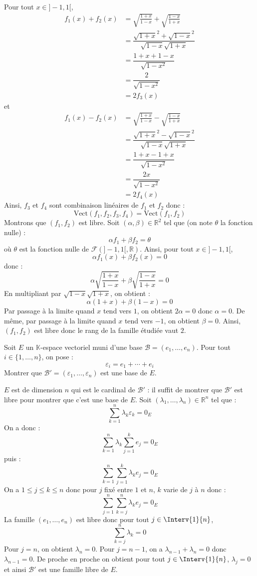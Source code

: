 \documentclass[a4paper,10pt]{report}
\begin{document}
\corr Pour tout $x \in ]-1,1[$,
\begin{align*}
 f_1(x)+f_2(x) & = \sqrt {\frac{1 + x}{1 - x}} + \sqrt {\frac{1 - x}{1 + x}}  \\
 & = \dfrac{\sqrt{1+x}^2 + \sqrt{1-x}^2}{\sqrt{1-x}\sqrt{1+x}} \\
 & = \dfrac{1+x+1-x}{\sqrt{1-x^2}}\\
 & = \dfrac{2}{\sqrt{1-x^2}}\\
 & = 2 f_3(x)
 \end{align*}
et 
\begin{align*}
 f_1(x)-f_2(x) & = \sqrt {\frac{1 + x}{1 - x}} - \sqrt {\frac{1 - x}{1 + x}}  \\
 & = \dfrac{\sqrt{1+x}^2 - \sqrt{1-x}^2}{\sqrt{1-x}\sqrt{1+x}} \\
 & = \dfrac{1+x-1+x}{\sqrt{1-x^2}}\\
 & = \dfrac{2x}{\sqrt{1-x^2}}\\
 & = 2 f_4(x)
 \end{align*}
 Ainsi, $f_3$ et $f_4$ sont combinaison linéaires de $f_1$ et $f_2$ donc :
 $$ \textrm{Vect}(f_1,f_2,f_3,f_4) = \textrm{Vect}(f_1,f_2)$$
Montrons que $(f_1,f_2)$ est libre. Soit $(\alpha, \beta) \in \mathbb{R}^2$ tel que (on note $\theta$ la fonction nulle) :
$$ \alpha f_1 + \beta f_2 = \theta$$
où $\theta$ est la fonction nulle de $\mathcal{F}(]-1,1[, \mathbb{R})$. Ainsi, pour tout $x \in ]-1,1[$,
$$ \alpha f_1(x)+ \beta f_2(x) = 0$$
donc :
$$ \alpha \sqrt {\frac{1 + x}{1 - x}} +  \beta \sqrt {\frac{1 - x}{1 + x}} = 0$$
En multipliant par $\sqrt{1-x} \sqrt{1+x}$, on obtient :
$$ \alpha (1+x) + \beta (1-x) = 0$$
Par passage à la limite quand $x$ tend vers $1$, on obtient $2\alpha=0$ donc $\alpha=0$. De même, par passage à la limite quand $x$ tend vers $-1$, on obtient $\beta=0$. Ainsi, $(f_1,f_2)$ est libre donc le rang de la famille étudiée vaut $2$.

\medskip

\begin{Exercice}{} Soit $E$ un $\mathbb{K}$-espace vectoriel muni d'une base $\mathcal{B} = (e_1 , \ldots ,e_n)$. Pour tout $i \in \lbrace 1, \ldots ,n \rbrace$, on pose :
$$\varepsilon_i = e_1 + \cdots + e_i$$
Montrer que $\mathcal{B}' = (\varepsilon_1 , \ldots ,\varepsilon_n)$ est une base de $E$.
\end{Exercice} 

\corr $E$ est de dimension $n$ qui est le cardinal de $\mathcal{B}'$ : il suffit de montrer que $\mathcal{B}'$ est libre pour montrer que c'est une base de $E$. Soit $(\lambda_1, \ldots, \lambda_n) \in \mathbb{R}^n$ tel que :
$$ \sum_{k=1}^n \lambda_k \varepsilon_k = 0_E$$
On a donc :
$$ \sum_{k=1}^n \lambda_k  \sum_{j=1}^k e_j = 0_E$$
puis : 
$$ \sum_{k=1}^n   \sum_{j=1}^k \lambda_k e_j = 0_E$$
On a $1 \leq j \leq k \leq n$ donc pour $j$ fixé entre $1$ et $n$, $k$ varie de $j$ à $n$ donc :
$$ \sum_{j=1}^n   \sum_{k=j}^n \lambda_k e_j = 0_E$$
La famille $(e_1, \ldots, e_n)$ est libre donc pour tout $j \in \Interv{1}{n}$,
$$ \sum_{k=j}^n \lambda_k = 0$$
Pour $j=n$, on obtient $\lambda_n=0$. Pour $j=n-1$, on a $\lambda_{n-1}+\lambda_n=0$ donc $\lambda_{n-1}=0$. De proche en proche on obtient pour tout $j \in \Interv{1}{n}$, $\lambda_j=0$ et ainsi $\mathcal{B}'$ est une famille libre de $E$.
\end{document}
